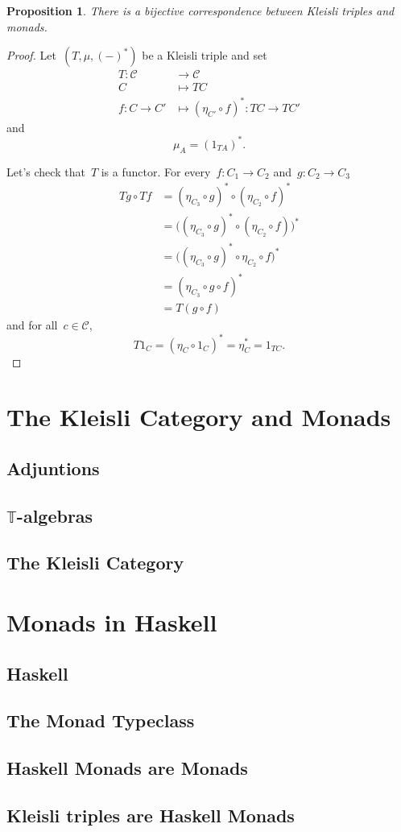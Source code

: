 \documentclass[a4paper]{article}
\theoremstyle{plain}
\newtheorem{proposition}[theorem]{Proposition}
\theoremstyle{definition}
\newcommand{\cat}[1]{\mathcal{#1}}
\begin{document}
\begin{proposition}
    There is a bijective correspondence between Kleisli triples and monads.
\end{proposition}
\begin{proof}
    Let~\((T, \mu, (-)^{\ast})\) be a Kleisli triple
    and set
    \begin{align*}
        T\colon \cat{C} & \longrightarrow\cat{C} \\
        C & \longmapsto TC \\
        f\colon C\rightarrow C' & \longmapsto
        (\eta_{C'}\circ f)^{\ast}\colon TC\longrightarrow TC'
    \end{align*}
    and
    \[
        \mu_{A} = (1_{TA})^{\ast}.
    \]

    Let's check that~\(T\) is a functor.
    For every~\(f\colon C_{1}\longrightarrow C_{2}\)
    and~\(g\colon C_{2}\longrightarrow C_{3}\)
    \begin{align*}
        Tg\circ Tf &= (\eta_{C_{3}}\circ g)^{\ast}\circ
                      (\eta_{C_{2}}\circ f)^{\ast} \\
                   &= \bigl((\eta_{C_{3}}\circ g)^{\ast}\circ
                      (\eta_{C_{2}}\circ f)\bigr)^{\ast} \\
                   &= \bigl((\eta_{C_{3}}\circ g)^{\ast}\circ
                      \eta_{C_{2}}\circ f\bigr)^{\ast} \\
                   &= (\eta_{C_{3}}\circ g\circ f)^{\ast} \\
                   &= T(g\circ f)
    \end{align*}
    and for all~\(c\in\cat{C}\),
    \[
        T1_{C} = (\eta_{C}\circ 1_{C})^{\ast} = \eta_{C}^{\ast} = 1_{TC}.
    \]
\end{proof}

\section{The Kleisli Category and Monads}
\subsection{Adjuntions}
\subsection{$\mathbb{T}$-algebras}
\subsection{The Kleisli Category}

\section{Monads in Haskell}
\subsection{Haskell}
\subsection{The Monad Typeclass}
\subsection{Haskell Monads are Monads}
\subsection{Kleisli triples are Haskell Monads}
\end{document}
